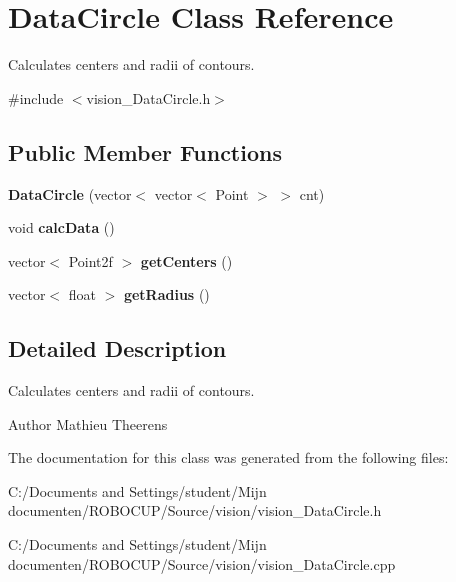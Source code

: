 \hypertarget{class_data_circle}{\section{Data\-Circle Class Reference}
\label{class_data_circle}
}


Calculates centers and radii of contours.  




{\ttfamily \#include $<$vision\-\_\-\-Data\-Circle.\-h$>$}

\subsection*{Public Member Functions}
\begin{DoxyCompactItemize}
\item 
\hypertarget{class_data_circle_a0e2dc7f2be5cdc590f4ce0c6ff47d937}{{\bfseries Data\-Circle} (vector$<$ vector$<$ Point $>$ $>$ cnt)}\label{class_data_circle_a0e2dc7f2be5cdc590f4ce0c6ff47d937}

\item 
\hypertarget{class_data_circle_a0c270b3738c9ed6b85497f52a7cc2908}{void {\bfseries calc\-Data} ()}\label{class_data_circle_a0c270b3738c9ed6b85497f52a7cc2908}

\item 
\hypertarget{class_data_circle_a982fef8ed3b93114cf605d4b71e552c4}{vector$<$ Point2f $>$ {\bfseries get\-Centers} ()}\label{class_data_circle_a982fef8ed3b93114cf605d4b71e552c4}

\item 
\hypertarget{class_data_circle_a2fbc42432e88b894e493639397dc25b8}{vector$<$ float $>$ {\bfseries get\-Radius} ()}\label{class_data_circle_a2fbc42432e88b894e493639397dc25b8}

\end{DoxyCompactItemize}


\subsection{Detailed Description}
Calculates centers and radii of contours. 

\begin{DoxyAuthor}{Author}
Mathieu Theerens 
\end{DoxyAuthor}


The documentation for this class was generated from the following files\-:\begin{DoxyCompactItemize}
\item 
C\-:/\-Documents and Settings/student/\-Mijn documenten/\-R\-O\-B\-O\-C\-U\-P/\-Source/vision/vision\-\_\-\-Data\-Circle.\-h\item 
C\-:/\-Documents and Settings/student/\-Mijn documenten/\-R\-O\-B\-O\-C\-U\-P/\-Source/vision/vision\-\_\-\-Data\-Circle.\-cpp\end{DoxyCompactItemize}
